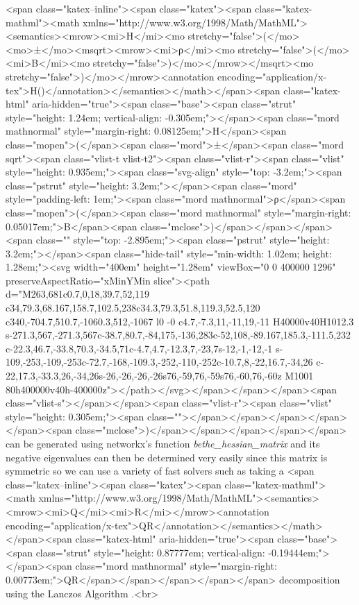 <span class="katex--inline"><span class="katex"><span class="katex-mathml"><math xmlns="http://www.w3.org/1998/Math/MathML"><semantics><mrow><mi>H</mi><mo stretchy="false">(</mo><mo>±</mo><msqrt><mrow><mi>ρ</mi><mo stretchy="false">(</mo><mi>B</mi><mo stretchy="false">)</mo></mrow></msqrt><mo stretchy="false">)</mo></mrow><annotation encoding="application/x-tex">H(\pm {})</annotation></semantics></math></span><span class="katex-html" aria-hidden="true"><span class="base"><span class="strut" style="height: 1.24em; vertical-align: -0.305em;"></span><span class="mord mathnormal" style="margin-right: 0.08125em;">H</span><span class="mopen">(</span><span class="mord">±</span><span class="mord sqrt"><span class="vlist-t vlist-t2"><span class="vlist-r"><span class="vlist" style="height: 0.935em;"><span class="svg-align" style="top: -3.2em;"><span class="pstrut" style="height: 3.2em;"></span><span class="mord" style="padding-left: 1em;"><span class="mord mathnormal">ρ</span><span class="mopen">(</span><span class="mord mathnormal" style="margin-right: 0.05017em;">B</span><span class="mclose">)</span></span></span><span class="" style="top: -2.895em;"><span class="pstrut" style="height: 3.2em;"></span><span class="hide-tail" style="min-width: 1.02em; height: 1.28em;"><svg width="400em" height="1.28em" viewBox="0 0 400000 1296" preserveAspectRatio="xMinYMin slice"><path d="M263,681c0.7,0,18,39.7,52,119
c34,79.3,68.167,158.7,102.5,238c34.3,79.3,51.8,119.3,52.5,120
c340,-704.7,510.7,-1060.3,512,-1067
l0 -0
c4.7,-7.3,11,-11,19,-11
H40000v40H1012.3
s-271.3,567,-271.3,567c-38.7,80.7,-84,175,-136,283c-52,108,-89.167,185.3,-111.5,232
c-22.3,46.7,-33.8,70.3,-34.5,71c-4.7,4.7,-12.3,7,-23,7s-12,-1,-12,-1
s-109,-253,-109,-253c-72.7,-168,-109.3,-252,-110,-252c-10.7,8,-22,16.7,-34,26
c-22,17.3,-33.3,26,-34,26s-26,-26,-26,-26s76,-59,76,-59s76,-60,76,-60z
M1001 80h400000v40h-400000z"></path></svg></span></span></span><span class="vlist-s">​</span></span><span class="vlist-r"><span class="vlist" style="height: 0.305em;"><span class=""></span></span></span></span></span><span class="mclose">)</span></span></span></span></span> can be generated using networkx’s  function \textit{bethe_hessian_matrix} and its negative eigenvalues can then be determined very easily since this matrix is symmetric so we can use a variety of fast solvers such as taking a <span class="katex--inline"><span class="katex"><span class="katex-mathml"><math xmlns="http://www.w3.org/1998/Math/MathML"><semantics><mrow><mi>Q</mi><mi>R</mi></mrow><annotation encoding="application/x-tex">QR</annotation></semantics></math></span><span class="katex-html" aria-hidden="true"><span class="base"><span class="strut" style="height: 0.87777em; vertical-align: -0.19444em;"></span><span class="mord mathnormal" style="margin-right: 0.00773em;">QR</span></span></span></span></span> decomposition using the Lanczos Algorithm \cite{trefethen1997numerical}.<br>
